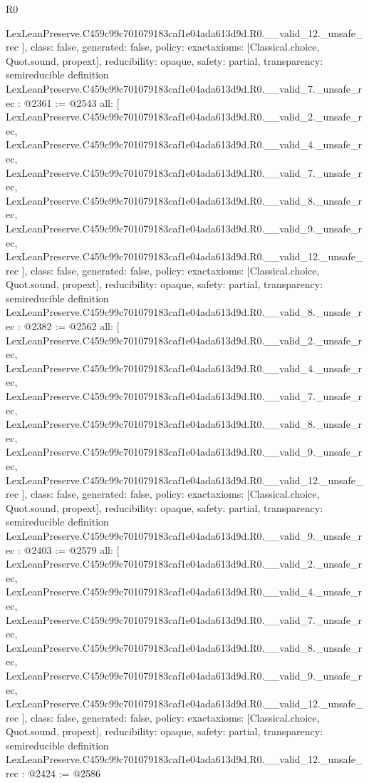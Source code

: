 \begin{lexlean}{R0}
\begin{coremodule}
{    LexLeanPreserve.C459c99c701079183caf1e04ada613d9d.R0.__valid_12._unsafe_rec
  ],
  class: false,
  generated: false,
  policy: exact{axioms: [Classical.choice, Quot.sound, propext]},
  reducibility: opaque{},
  safety: partial,
  transparency: semireducible
}
definition LexLeanPreserve.C459c99c701079183caf1e04ada613d9d.R0.__valid_7._unsafe_rec : @2361 := @2543 {
  all: [
    LexLeanPreserve.C459c99c701079183caf1e04ada613d9d.R0.__valid_2._unsafe_rec,
    LexLeanPreserve.C459c99c701079183caf1e04ada613d9d.R0.__valid_4._unsafe_rec,
    LexLeanPreserve.C459c99c701079183caf1e04ada613d9d.R0.__valid_7._unsafe_rec,
    LexLeanPreserve.C459c99c701079183caf1e04ada613d9d.R0.__valid_8._unsafe_rec,
    LexLeanPreserve.C459c99c701079183caf1e04ada613d9d.R0.__valid_9._unsafe_rec,
    LexLeanPreserve.C459c99c701079183caf1e04ada613d9d.R0.__valid_12._unsafe_rec
  ],
  class: false,
  generated: false,
  policy: exact{axioms: [Classical.choice, Quot.sound, propext]},
  reducibility: opaque{},
  safety: partial,
  transparency: semireducible
}
definition LexLeanPreserve.C459c99c701079183caf1e04ada613d9d.R0.__valid_8._unsafe_rec : @2382 := @2562 {
  all: [
    LexLeanPreserve.C459c99c701079183caf1e04ada613d9d.R0.__valid_2._unsafe_rec,
    LexLeanPreserve.C459c99c701079183caf1e04ada613d9d.R0.__valid_4._unsafe_rec,
    LexLeanPreserve.C459c99c701079183caf1e04ada613d9d.R0.__valid_7._unsafe_rec,
    LexLeanPreserve.C459c99c701079183caf1e04ada613d9d.R0.__valid_8._unsafe_rec,
    LexLeanPreserve.C459c99c701079183caf1e04ada613d9d.R0.__valid_9._unsafe_rec,
    LexLeanPreserve.C459c99c701079183caf1e04ada613d9d.R0.__valid_12._unsafe_rec
  ],
  class: false,
  generated: false,
  policy: exact{axioms: [Classical.choice, Quot.sound, propext]},
  reducibility: opaque{},
  safety: partial,
  transparency: semireducible
}
definition LexLeanPreserve.C459c99c701079183caf1e04ada613d9d.R0.__valid_9._unsafe_rec : @2403 := @2579 {
  all: [
    LexLeanPreserve.C459c99c701079183caf1e04ada613d9d.R0.__valid_2._unsafe_rec,
    LexLeanPreserve.C459c99c701079183caf1e04ada613d9d.R0.__valid_4._unsafe_rec,
    LexLeanPreserve.C459c99c701079183caf1e04ada613d9d.R0.__valid_7._unsafe_rec,
    LexLeanPreserve.C459c99c701079183caf1e04ada613d9d.R0.__valid_8._unsafe_rec,
    LexLeanPreserve.C459c99c701079183caf1e04ada613d9d.R0.__valid_9._unsafe_rec,
    LexLeanPreserve.C459c99c701079183caf1e04ada613d9d.R0.__valid_12._unsafe_rec
  ],
  class: false,
  generated: false,
  policy: exact{axioms: [Classical.choice, Quot.sound, propext]},
  reducibility: opaque{},
  safety: partial,
  transparency: semireducible
}
definition LexLeanPreserve.C459c99c701079183caf1e04ada613d9d.R0.__valid_12._unsafe_rec : @2424 := @2586 {
}
\end{coremodule}
\end{lexlean}
